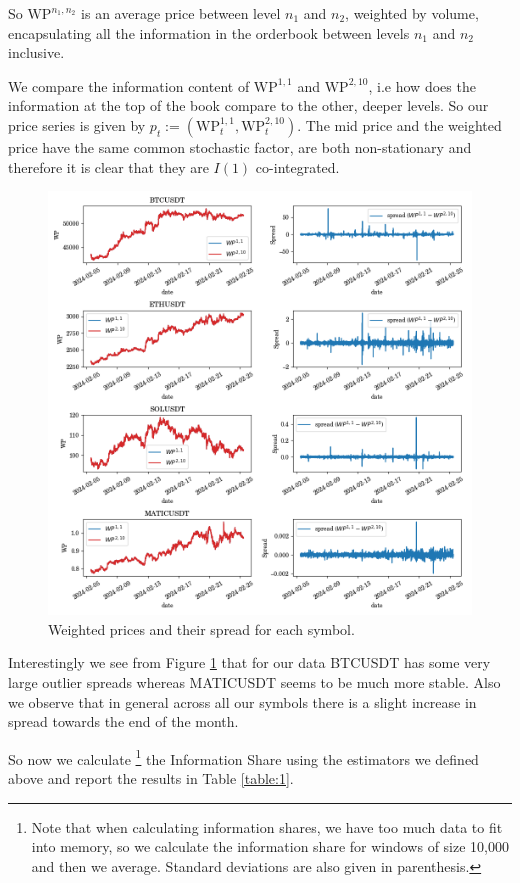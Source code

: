 \documentclass[a4paper, oneside, notitlepage]{book}
\begin{document}
So $\text{WP}^{n_{1},n_{2}}$ is an average price between level $n_{1}$ and $n_{2}$, weighted by volume, encapsulating all the information in the orderbook between levels $n_{1}$ and $n_{2}$ inclusive.

We compare the information content of $\text{WP}^{1,1}$ and $\text{WP}^{2,10}$, i.e how does the information
at the top of the book compare to the other, deeper levels.
So our price series is given by $p_t := (\text{WP}^{1,1}_t, \text{WP}^{2,10}_t)$.
The mid price and the weighted price have the same common stochastic factor,
are both non-stationary and therefore it is clear that they are $I(1)$ co-integrated.

\begin{figure}[htpb]
    \centering
    \includegraphics[width=1.0\textwidth]{./images/weighted_prices.png}
    \caption{Weighted prices and their spread for each symbol.}
    \label{spread}
\end{figure}

Interestingly we see from Figure \ref{spread} that for our data BTCUSDT
has some very large outlier spreads whereas MATICUSDT seems to be much more stable.
Also we observe that in general across all our symbols there is a slight increase
in spread towards the end of the month.


So now we calculate \footnote{Note that when calculating information shares, we have too much data to fit
into memory, so we calculate the information share for windows of size 10,000 and then
we average. Standard deviations are also given in parenthesis.} the Information Share using the estimators we defined above
and report the results in Table \ref{table:1}.
\end{document}
